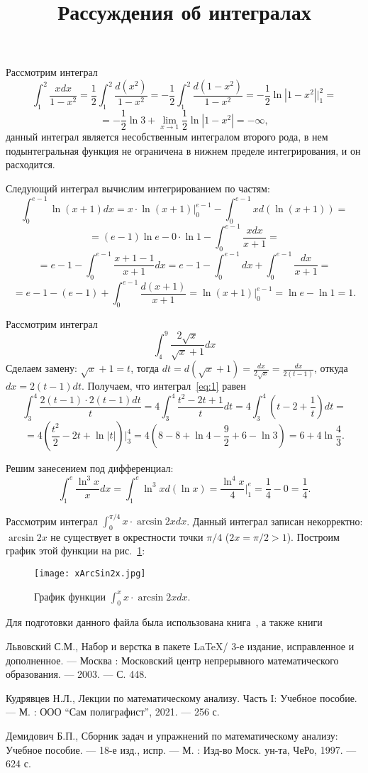 \documentclass{article}
\title{Рассуждения об интегралах}
\begin{document}
\maketitle

Рассмотрим интеграл
 $$\int_1^2\frac{xdx}{1-x^2}=\frac{1}{2}\int_1^2\frac{d(x^2)}{1-x^2}=-\frac{1}{2}\int_1^2\frac{d(1-x^2)}{1-x^2}=-\frac{1}{2}\ln|1-x^2|\Big|_1^2=$$
 $$=-\frac12\ln3+\lim\limits_{x\to1}\frac12\ln|1-x^2|=-\infty,$$
данный интеграл является несобственным интегралом второго рода, в нем подынтегральная функция не ограничена в нижнем пределе интегрирования, и он расходится.

Следующий интеграл вычислим  интегрированием по частям:
$$\int_0^{e-1}\ln(x+1)dx=x\cdot\ln(x+1)\Big|_0^{e-1}-\int_0^{e-1}xd(\ln(x+1))=$$
$$=(e-1)\ln e-0\cdot\ln 1-\int_0^{e-1}\frac{xdx}{x+1}=$$
$$=e-1-\int_0^{e-1}\frac{x+1-1}{x+1}dx=e-1-\int_0^{e-1}dx+\int_0^{e-1}\frac{dx}{x+1}=$$
$$=e-1-(e-1)+\int_0^{e-1}\frac{d(x+1)}{x+1}=\ln(x+1)\Big|_0^{e-1}=\ln e-\ln 1=1.$$

Рассмотрим интеграл
\begin{equation}\label{eq:1}
\int_4^9\frac{2\sqrt{x}}{\sqrt{x}+1}dx
\end{equation}
Сделаем замену: $\sqrt{x}+1=t$, тогда $dt=d(\sqrt{x}+1)=\frac{dx}{2\sqrt{x}}=\frac{dx}{2(t-1)}$, откуда $dx=2(t-1)dt$. Получаем, что интеграл~\eqref{eq:1} равен
 $$\int_3^4\frac{2(t-1)\cdot 2(t-1)dt}{t}=4\int_3^4\frac{t^2-2t+1}{t}dt=4\int_3^4\left(t-2+\frac{1}{t}\right)dt=$$
 $$=4\left(\frac{t^2}{2}-2t+\ln|t|\right)\Big|_3^4=4\left(8-8+\ln4-\frac{9}{2}+6-\ln3\right)=6+4\ln\frac43.$$
 
Решим занесением под дифференциал:
$$\int_1^e\frac{\ln^3x}{x}dx=\int_1^e \ln^3xd(\ln x)=\frac{\ln^4x}{4}\Big|_1^e=\frac14-0=\frac14.$$
 
Рассмотрим интеграл $\int_0^{\pi/4}x \cdot \arcsin 2x dx$. Данный интеграл записан некорректно: $\arcsin 2x$ не существует в окрестности точки $\pi/4$ ($2x=\pi/2>1$). Построим график этой функции на рис.~\ref{graph1}:

\begin{figure}
\centering
\texttt{[image: xArcSin2x.jpg]}
\caption{График функции $\int_0^{x}x \cdot \arcsin 2x dx$.}
\label{graph1}
\end{figure}

Для подготовки данного файла была использована книга~\cite{lvov}, а также книги~\cite{kudr, demid}

\begin{thebibliography}{9}

  Львовский С.М., Набор и верстка в пакете \LaTeX / 3-е издание, исправленное и дополненное. --- Москва : Московский центр непрерывного математического образования. --- 2003. --- С. 448.

 Кудрявцев Н.Л., Лекции по математическому анализу. Часть I: Учебное пособие. --- М. :  ООО ``Сам полиграфист'',  2021. --- 256 с.

 Демидович Б.П., Сборник задач и упражнений по математическому анализу: Учебное пособие. --- 18-е изд., испр. --- М. : Изд-во Моск. ун-та, ЧеРо, 1997. --- 624 с.

\end{thebibliography}
 
\end{document}
